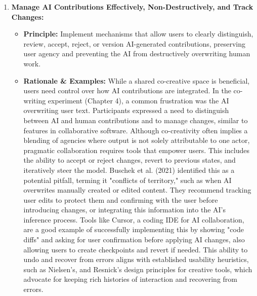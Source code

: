 \begin{enumerate}[label=\arabic*., wide, labelindent=0pt]
\item \textbf{Manage AI Contributions Effectively, Non-Destructively, and Track Changes:}
    \begin{itemize}[label=\textbullet, leftmargin=*]
        \item \textbf{Principle:} Implement mechanisms that allow users to clearly distinguish, review, accept, reject, or version AI-generated contributions, preserving user agency and preventing the AI from destructively overwriting human work.
        \item \textbf{Rationale \& Examples:} While a shared co-creative space is beneficial, users need control over how AI contributions are integrated. In the co-writing experiment (Chapter 4), a common frustration was the AI overwriting user text. Participants expressed a need to distinguish between AI and human contributions and to manage changes, similar to features in collaborative software. Although co-creativity often implies a blending of agencies where output is not solely attributable to one actor, pragmatic collaboration requires tools that empower users. This includes the ability to accept or reject changes, revert to previous states, and iteratively steer the model. Buschek et al. (2021) identified this as a potential pitfall, terming it "conflicts of territory," such as when AI overwrites manually created or edited content. They recommend tracking user edits to protect them and confirming with the user before introducing changes, or integrating this information into the AI's inference process. Tools like Cursor, a coding IDE for AI collaboration, are a good example of successfully implementing this by showing "code diffs" and asking for user confirmation before applying AI changes, also allowing users to create checkpoints and revert if needed. This ability to undo and recover from errors aligns with established usability heuristics, such as Nielsen's, and Resnick's design principles for creative tools, which advocate for keeping rich histories of interaction and recovering from errors.
    \end{itemize}



\end{enumerate}
